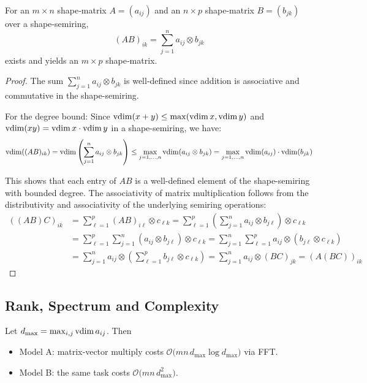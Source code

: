 \begin{theorem}
For an $m\times n$ shape‑matrix $A=(a_{ij})$ and an $n\times p$ shape‑matrix $B=(b_{jk})$ over a shape‑semiring,
\[(AB)_{ik}=\sum_{j=1}^{n} a_{ij}\otimes b_{jk}\] exists and yields an $m\times p$ shape‑matrix.
\end{theorem}
\begin{proof}
The sum $\sum_{j=1}^{n} a_{ij}\otimes b_{jk}$ is well-defined since addition is associative and commutative in the shape-semiring. 

For the degree bound: Since $\operatorname{vdim}(x+y) \leq \max(\operatorname{vdim} x, \operatorname{vdim} y)$ and $\operatorname{vdim}(xy) = \operatorname{vdim} x \cdot \operatorname{vdim} y$ in a shape-semiring, we have:
\[\operatorname{vdim}((AB)_{ik}) = \operatorname{vdim}\left(\sum_{j=1}^{n} a_{ij}\otimes b_{jk}\right) \leq \max_{j=1,\ldots,n} \operatorname{vdim}(a_{ij}\otimes b_{jk}) = \max_{j=1,\ldots,n} \operatorname{vdim}(a_{ij}) \cdot \operatorname{vdim}(b_{jk})\]

This shows that each entry of $AB$ is a well-defined element of the shape-semiring with bounded degree. The associativity of matrix multiplication follows from the distributivity and associativity of the underlying semiring operations:
\begin{align}
((AB)C)_{ik} &= \sum_{\ell=1}^{p} (AB)_{i\ell} \otimes c_{\ell k} = \sum_{\ell=1}^{p} \left(\sum_{j=1}^{n} a_{ij} \otimes b_{j\ell}\right) \otimes c_{\ell k} \\
&= \sum_{\ell=1}^{p} \sum_{j=1}^{n} (a_{ij} \otimes b_{j\ell}) \otimes c_{\ell k} = \sum_{j=1}^{n} \sum_{\ell=1}^{p} a_{ij} \otimes (b_{j\ell} \otimes c_{\ell k}) \\
&= \sum_{j=1}^{n} a_{ij} \otimes \left(\sum_{\ell=1}^{p} b_{j\ell} \otimes c_{\ell k}\right) = \sum_{j=1}^{n} a_{ij} \otimes (BC)_{jk} = (A(BC))_{ik}
\end{align}
\end{proof}

\subsection{Rank, Spectrum and Complexity}
\begin{theorem}[Complexity]\label{thm:complexity}
Let $d_{\max}=\max_{i,j}\operatorname{vdim} a_{ij}$.  Then
\begin{itemize}[leftmargin=1.5em]
  \item Model A: matrix‑vector multiply costs $\mbox{$\mathcal O\bigl(mn\,d_{\max}\log d_{\max}\bigr)$}$ via FFT.
  \item Model B: the same task costs $\mbox{$\mathcal O\bigl(mn\,d_{\max}^{2}\bigr)$}$.
\end{itemize}
\end{theorem}
